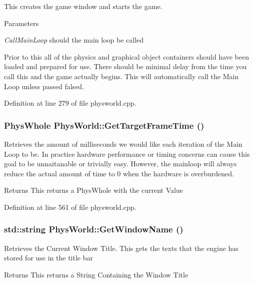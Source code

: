 This creates the game window and starts the game. 
\begin{DoxyParams}{Parameters}
\item[{\em CallMainLoop}]should the main loop be called\end{DoxyParams}
Prior to this all of the physics and graphical object containers should have been loaded and prepared for use. There should be minimal delay from the time you call this and the game actually begins. This will automatically call the Main Loop unless passed falsed. 

Definition at line 279 of file physworld.cpp.\hypertarget{classPhysWorld_a33e8430ed43897276ca55fbb47e54bcf}{
\subsubsection[{GetTargetFrameTime}]{\setlength{\rightskip}{0pt plus 5cm}PhysWhole PhysWorld::GetTargetFrameTime ()}}
\label{db/df5/classPhysWorld_a33e8430ed43897276ca55fbb47e54bcf}


Retrieves the amount of milliseconds we would like each iteration of the Main Loop to be. In practice hardware performance or timing concerns can cause this goal to be unnaitanable or trivially easy. However, the mainloop will always reduce the actual amount of time to 0 when the hardware is overburdened. \begin{DoxyReturn}{Returns}
This returns a PhysWhole with the current Value 
\end{DoxyReturn}


Definition at line 561 of file physworld.cpp.\hypertarget{classPhysWorld_a09163480a549b39a945ee97415eabdc0}{
\subsubsection[{GetWindowName}]{\setlength{\rightskip}{0pt plus 5cm}std::string PhysWorld::GetWindowName ()}}
\label{db/df5/classPhysWorld_a09163480a549b39a945ee97415eabdc0}


Retrieves the Current Window Title. This gets the texts that the engine has stored for use in the title bar \begin{DoxyReturn}{Returns}
This returns a String Containing the Window Title 
\end{DoxyReturn}


